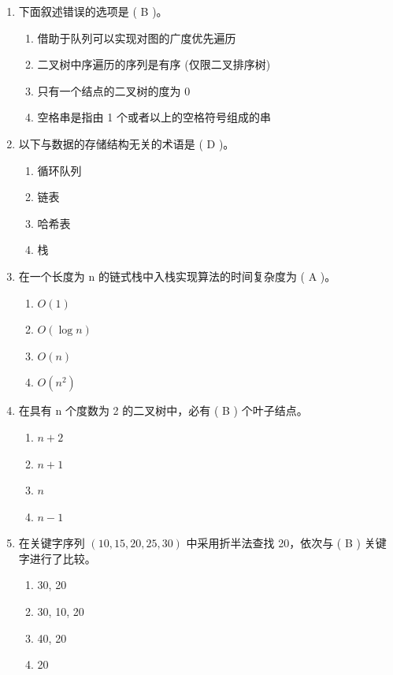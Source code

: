 \documentclass[12pt, a4paper]{article}
\begin{document}
\begin{enumerate}[label=\arabic*.]
    \item 下面叙述错误的选项是 ( B )。
    \begin{enumerate}
        \item 借助于队列可以实现对图的广度优先遍历
        \item 二叉树中序遍历的序列是有序 (仅限二叉排序树)
        \item 只有一个结点的二叉树的度为 0
        \item 空格串是指由 1 个或者以上的空格符号组成的串
    \end{enumerate}

    \item 以下与数据的存储结构无关的术语是 ( D )。
    \begin{enumerate}
        \item 循环队列
        \item 链表
        \item 哈希表
        \item 栈
    \end{enumerate}

    \item 在一个长度为 n 的链式栈中入栈实现算法的时间复杂度为 ( A )。
    \begin{enumerate}
        \item $O(1)$
        \item $O(\log n)$
        \item $O(n)$
        \item $O(n^2)$
    \end{enumerate}

    \item 在具有 n 个度数为 2 的二叉树中，必有 ( B ) 个叶子结点。
    \begin{enumerate}
        \item $n+2$
        \item $n+1$
        \item $n$
        \item $n-1$
    \end{enumerate}

    \item 在关键字序列 $(10, 15, 20, 25, 30)$ 中采用折半法查找 20，依次与 ( B ) 关键字进行了比较。
    \begin{enumerate}
        \item 30, 20
        \item 30, 10, 20
        \item 40, 20
        \item 20
    \end{enumerate}


\end{enumerate}
\end{document}
